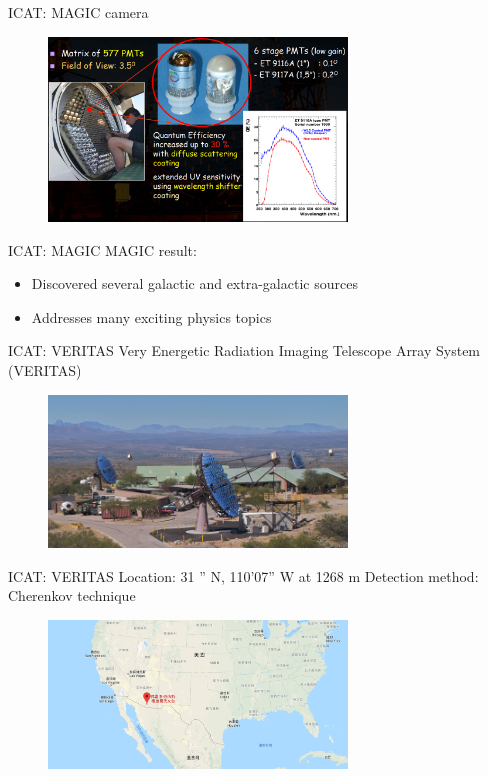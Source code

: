 \documentclass{beamer}
\begin{document}
\begin{frame}{ICAT: MAGIC camera}
    \begin{figure}[h]
        \includegraphics[width=300px]{MAGIC_PMTs.png}
    \end{figure}
\end{frame}


\begin{frame}{ICAT: MAGIC}
    MAGIC result:
    \begin{itemize}
        \item Discovered several galactic and extra-galactic sources
        \item Addresses many exciting physics topics
    \end{itemize}
\end{frame}


\begin{frame}{ICAT: VERITAS}
    Very Energetic Radiation Imaging Telescope Array System (VERITAS)
    \begin{figure}[h]
        \includegraphics[width=300px]{VERITAS.jpg}
    \end{figure}
\end{frame}


\begin{frame}{ICAT: VERITAS}
    Location: 31 '' N, 110'07'' W at 1268 m
    \newline
    Detection method:  Cherenkov technique
    \begin{figure}[h]
        \includegraphics[width=300px]{VERITAS_location.png}
    \end{figure}
\end{frame}
\end{document}
